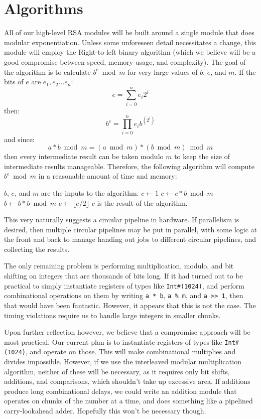 \documentclass[12pt]{article}
\begin{document}
\section{Algorithms}
All of our high-level RSA modules will be built around a single module that does modular exponentiation.
Unless some unforeseen detail necessitates a change, this module will employ the Right-to-left binary algorithm
(which we believe will be a good compromise between speed, memory usage, and complexity).
The goal of the algorithm is to calculate $b^e \bmod m$ for very large values of $b$, $e$, and $m$.
If the bits of $e$ are $e_1, e_2 \dots e_n$:
\begin{equation}
e = \sum_{i = 0}^{n} e_i 2^i
\end{equation}
then:
\begin{equation}
b^e = \prod_{i = 0}^{n} e_i b^{(2^i)}
\end{equation}
and since:
\begin{equation}
a * b \bmod m = (a \bmod m) * (b \bmod m) \bmod m
\end{equation}
then every intermediate result can be taken modulo $m$ to keep the size of intermediate results manageable.
Therefore, the following algorithm will compute $b^e \bmod m$ in a reasonable amount of time and memory:
\begin{algorithmic}
\State $b$, $e$, and $m$ are the inputs to the algorithm.
\State $c \gets 1$
		\State $c \gets c * b \bmod m$
	\EndIf
	\State $b \gets b * b \bmod m$
	\State $e \gets \lfloor e / 2 \rfloor$
\EndWhile
\State $c$ is the result of the algorithm.
\end{algorithmic}
This very naturally suggests a circular pipeline in hardware.
If parallelism is desired, then multiple circular pipelines may be put in parallel,
with some logic at the front and back to manage handing out jobs to different circular pipelines,
and collecting the results.

The only remaining problem is performing multiplication, modulo, and bit shifting
on integers that are thousands of bits long.
If it had turned out to be practical to simply instantiate registers of types like {\tt Int\#(1024)},
and perform combinational operations on them by writing {\tt a~*~b}, {\tt a~\%~m}, and {\tt a~>>~1},
then that would have been fantastic.
However, it appears that this is not the case.
The timing violations require us to handle large integers in smaller chunks.

Upon further reflection however, we believe that a compromise approach will be most practical.
Our current plan is to instantiate registers of types like {\tt Int\#(1024)}, and operate on those.
This will make combinational multiplies and divides impossible.
However, if we use the interleaved modular multiplication algorithm,
neither of these will be necessary, as it requires only bit shifts, additions, and comparisons,
which shouldn't take up excessive area.
If additions produce long combinational delays,
we could write an addition module that operates on chunks of the number at a time,
and does something like a pipelined carry-lookahead adder.
Hopefully this won't be necessary though.
\end{document}
